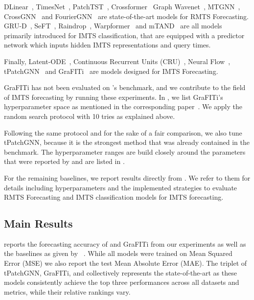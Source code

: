 DLinear~\cite{Zeng2023.Are}, TimesNet~\cite{Wu2022.TimesNet}, PatchTST~\cite{Nie2022.Time}, Crossformer~\cite{Zhang2022.Crossformer}
Graph Wavenet~\cite{Wu2019.Graph}, MTGNN~\cite{Wu2020.Connecting}, CrossGNN~\cite{Huang2023.CrossGNN} and FourierGNN~\cite{Yi2023.FourierGNN} are state-of-the-art models for RMTS Forecasting.
GRU-D~\cite{Che2018.Recurrent}, SeFT~\cite{Horn2020.Set}, Raindrop~\cite{Zhang2021.GraphGuided},
Warpformer~\cite{Zhang2023.Warpformer} and mTAND~\cite{Shukla2020.MultiTime} are 
all models primarily introduced for IMTS classification, that are equipped with a predictor network which inputs 
hidden  IMTS representations and query times.  
 
Finally, Latent-ODE~\cite{Rubanova2019.Latent}, Continuous Recurrent Units (CRU)~\cite{Schirmer2022.Modeling}, Neural Flow~\cite{Bilos2021.Neural}, tPatchGNN~\cite{Zhang.Irregular} and GraFITi~\cite{Yalavarthi2023.Forecasting} 
are models designed for IMTS Forecasting.

GraFITi has not been evaluated on \citeauthor{Zhang.Irregular}'s benchmark, and we contribute to the field of IMTS forecasting by running these experiments.
In , we list GraFITi's hyperparameter space as mentioned in the corresponding paper~\cite{Yalavarthi2023.Forecasting}.
We apply the random search protocol with 10 tries as explained above.  

Following the same protocol and for the sake of a fair comparison, we also tune tPatchGNN, because it is the strongest method that was already contained in the benchmark. 
The hyperparameter ranges are build closely around the parameters that were reported by \citeauthor{Zhang.Irregular} and are listed in . 

For the remaining baselines, we report results directly from \citeauthor{Zhang.Irregular}.
We refer to them for details including hyperparameters and the implemented strategies to evaluate RMTS Forecasting and IMTS classification models for IMTS forecasting.

\subsection{Main Results}

 reports the forecasting accuracy of \model{} and GraFITi from our experiments as well as the baselines as given by \citeauthor{Zhang.Irregular}~\cite{Zhang.Irregular}.
While all models were trained on Mean Squared Error (MSE) we also report the test Mean Absolute Error (MAE).
The triplet of tPatchGNN, GraFITi, and \model{} collectively represents the state-of-the-art as these models consistently achieve the top three performances across all datasets and metrics, while their relative rankings vary.

